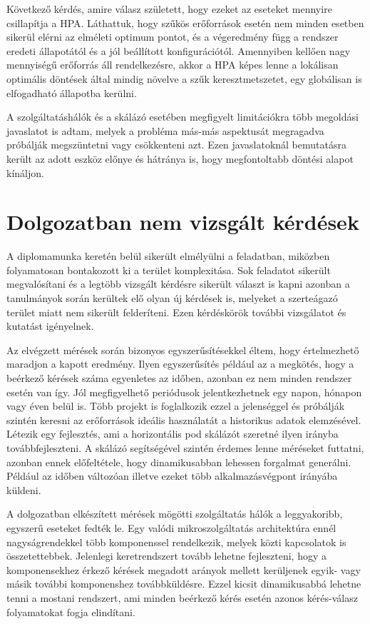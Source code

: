 Következő kérdés, amire válasz született, hogy ezeket az eseteket mennyire csillapítja a HPA.
Láthattuk, hogy szűkös erőforrások esetén nem minden esetben sikerül elérni az elméleti optimum pontot, és a végeredmény függ a rendszer eredeti állapotától és a jól beállított konfigurációtól.
Amennyiben kellően nagy mennyiségű erőforrás áll rendelkezésre, akkor a HPA képes lenne a lokálisan optimális döntések által mindig növelve a szűk keresztmetszetet, egy globálisan is elfogadható állapotba kerülni.

A szolgáltatáshálók és a skálázó esetében megfigyelt limitációkra több megoldási javaslatot is adtam, melyek a probléma más-más aspektusát megragadva próbálják megszüntetni vagy csökkenteni azt.
Ezen javaslatoknál bemutatásra került az adott eszköz előnye és hátránya is, hogy megfontoltabb döntési alapot kínáljon.

\section{Dolgozatban nem vizsgált kérdések}
A diplomamunka keretén belül sikerült elmélyülni a feladatban, miközben folyamatosan bontakozott ki a terület komplexitása.
Sok feladatot sikerült megvalósítani és a legtöbb vizsgált kérdésre sikerült választ is kapni azonban a tanulmányok során kerültek elő olyan új kérdések is, melyeket a szerteágazó terület miatt nem sikerült felderíteni.
Ezen kérdéskörök további vizsgálatot és kutatást igényelnek.

Az elvégzett mérések során bizonyos egyszerűsítésekkel éltem, hogy értelmezhető maradjon a kapott eredmény.
Ilyen egyszerűsítés például az a megkötés, hogy a beérkező kérések száma egyenletes az időben, azonban ez nem minden rendszer esetén van így.
Jól megfigyelhető periódusok jelentkezhetnek egy napon, hónapon vagy éven belül is.
Több projekt is foglalkozik ezzel a jelenséggel és próbálják szintén keresni az erőforrások ideális használatát a historikus adatok elemzésével.
Létezik egy fejlesztés, ami a horizontális pod skálázót szeretné ilyen irányba továbbfejleszteni\citep{predictiveHPAGithub}.
A skálázó segítségével szintén érdemes lenne méréseket futtatni, azonban ennek előfeltétele, hogy dinamikusabban lehessen forgalmat generálni.
Például az időben változóan illetve ezeket több alkalmazásvégpont irányába küldeni.

A dolgozatban elkészített mérések mögötti szolgáltatás hálók a leggyakoribb, egyszerű eseteket fedték le.
Egy valódi mikroszolgáltatás architektúra ennél nagyságrendekkel több komponenssel rendelkezik, melyek közti kapcsolatok is összetettebbek.
Jelenlegi keretrendszert tovább lehetne fejleszteni, hogy a komponensekhez érkező kérések megadott arányok mellett kerüljenek egyik- vagy másik további komponenshez továbbküldésre.
Ezzel kicsit dinamikusabbá lehetne tenni a mostani rendszert, ami minden beérkező kérés esetén azonos kérés-válasz folyamatokat fogja elindítani.

